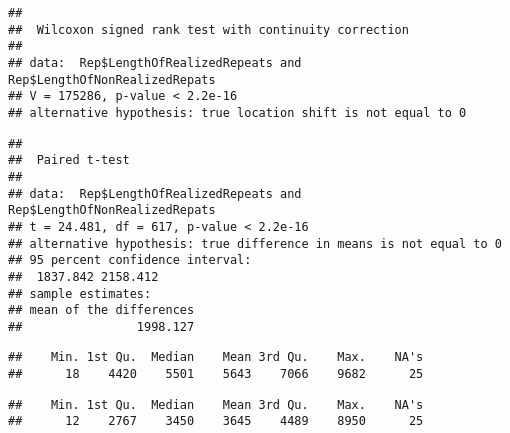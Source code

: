 \documentclass[]{article}
\newenvironment{Shaded}{\begin{snugshade}}{\end{snugshade}}
\newcommand{\CommentTok}[1]{\textcolor[rgb]{0.56,0.35,0.01}{\textit{#1}}}
\newcommand{\DataTypeTok}[1]{\textcolor[rgb]{0.13,0.29,0.53}{#1}}
\newcommand{\KeywordTok}[1]{\textcolor[rgb]{0.13,0.29,0.53}{\textbf{#1}}}
\newcommand{\NormalTok}[1]{#1}
\newcommand{\OperatorTok}[1]{\textcolor[rgb]{0.81,0.36,0.00}{\textbf{#1}}}
\newcommand{\OtherTok}[1]{\textcolor[rgb]{0.56,0.35,0.01}{#1}}
\begin{document}
\begin{verbatim}
## 
##  Wilcoxon signed rank test with continuity correction
## 
## data:  Rep$LengthOfRealizedRepeats and Rep$LengthOfNonRealizedRepats
## V = 175286, p-value < 2.2e-16
## alternative hypothesis: true location shift is not equal to 0
\end{verbatim}

\begin{Shaded}
\end{Shaded}

\begin{verbatim}
## 
##  Paired t-test
## 
## data:  Rep$LengthOfRealizedRepeats and Rep$LengthOfNonRealizedRepats
## t = 24.481, df = 617, p-value < 2.2e-16
## alternative hypothesis: true difference in means is not equal to 0
## 95 percent confidence interval:
##  1837.842 2158.412
## sample estimates:
## mean of the differences 
##                1998.127
\end{verbatim}

\begin{Shaded}
\end{Shaded}

\begin{verbatim}
##    Min. 1st Qu.  Median    Mean 3rd Qu.    Max.    NA's 
##      18    4420    5501    5643    7066    9682      25
\end{verbatim}

\begin{Shaded}
\end{Shaded}

\begin{verbatim}
##    Min. 1st Qu.  Median    Mean 3rd Qu.    Max.    NA's 
##      12    2767    3450    3645    4489    8950      25
\end{verbatim}
\end{document}
